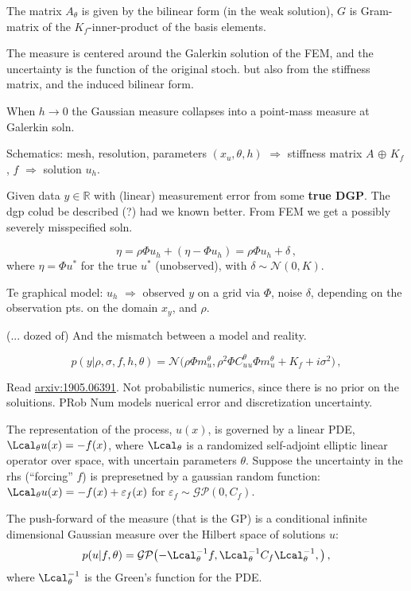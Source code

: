 The matrix $A_\theta$ is given by the bilinear form (in the weak solution),
$G$ is Gram-matrix of the $K_f$-inner-product of the basis elements.

The measure is centered around the Galerkin solution of the FEM,
and the uncertainty is the function of the original stoch. but also
from the stiffness matrix, and the induced bilinear form.

When $h\to 0$ the Gaussian measure collapses into a point-mass
measure at Galerkin soln.

Schematics: mesh, resolution, parameters $(x_u, \theta, h)$ $\Rightarrow$
stiffness matrix $A$ $\oplus$ $K_f$, $f$ $\Rightarrow$ solution
$u_h$.

Given data $y\in \mathbb{R}$ with (linear) measurement error from some
\textbf{true DGP}. The dgp colud be described (?) had we known
better. From FEM we get a possibly severely misspecified soln.

$$
\eta
    = \rho \Phi u_h + (\eta - \Phi u_h)
    = \rho \Phi u_h + \delta
    \,, $$
where $\eta = \Phi u^*$ for the true $u^*$ (unobserved), with
$\delta \sim \mathcal{N}(0, K)$.


Te graphical model:
$u_h$ $\Rightarrow$ observed $y$ on a grid via $\Phi$, noise $\delta$,
depending on the observation pts. on the domain $x_y$, and $\rho$.

(... dozed of)
And the mismatch between a model and reality.

$$
p(y\vert \rho, \sigma, f, h, \theta)
    = \mathcal{N}\bigl(
        \rho \Phi m^\theta_u,
        \rho^2 \Phi C_u^\theta_u \Phi m^\theta_u
        + K_f + i\sigma^2
    \bigr)
    \,, $$


Read \url{arxiv:1905.06391}. Not probabilistic numerics, since there
is no prior on the soluitions. PRob Num models nuerical error and discretization
uncertainty.


The representation of the process, $u(x)$, is governed by a linear PDE,
$\Lcal_\theta u(x) = -f(x)$, where $\Lcal_\theta$ is a randomized
self-adjoint elliptic linear operator over space, with uncertain
parameters $\theta$. Suppose the uncertainty in the rhs (``forcing''
$f$) is prepresetned by a gaussian random function:
$
\Lcal_\theta u(x)
    = -f(x) + \varepsilon_f(x)
$ for $\varepsilon_f\sim \mathcal{GP}(0, C_f)$.

The push-forward of the measure (that is the GP) is a conditional
infinite dimensional Gaussian measure over the Hilbert space of
solutions $u$:
$$
p(u \vert f, \theta)
    = \mathcal{GP}\bigl(
        - \Lcal_\theta^{-1} f,
        \Lcal_\theta^{-1} C_f \Lcal_\theta^{-1},
    \bigr)
    \,, $$
where $\Lcal_\theta^{-1}$ is the Green's function for the PDE.




